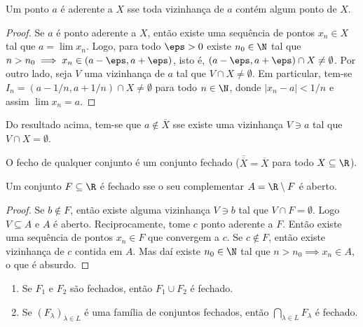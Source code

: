 \documentclass{article}
\begin{document}
\begin{prop}
    Um ponto \(a\) é aderente a \(X\) sse toda vizinhança de \(a\) contém algum ponto de \(X\).
\end{prop}

\begin{proof}
    Se \(a\) é ponto aderente a \(X\), então existe uma sequência de pontos \(x_n \in X\) tal que \(a = \lim x_n\). Logo, para todo \(\eps > 0\) existe \(n_0 \in \N\) tal que \(n > n_0 \implies x_n \in (a-\eps, a+\eps)\), isto é, \((a-\eps, a+\eps) \cap X \neq \emptyset\).
    Por outro lado, seja \(V\) uma vizinhança de \(a\) tal que \(V \cap X \neq \emptyset\). Em particular, tem-se \(I_n = (a-1/n, a+1/n) \cap X \neq \emptyset\) para todo \(n \in \N\), donde \(|x_n - a| < 1/n\) e assim \(\lim x_n = a\).
\end{proof}

\begin{rem}
    Do resultado acima, tem-se que \(a \notin \overline{X}\) sse existe uma vizinhança \(V \ni a\) tal que \(V \cap X = \emptyset\).
\end{rem}

\begin{cor}
    O fecho de qualquer conjunto é um conjunto fechado (\(\overline{\overline{X}} = \overline{X}\) para todo \(X \subseteq \R\)).
\end{cor}

\begin{prop}
    Um conjunto \(F \subseteq \R\) é fechado sse o seu complementar \(A = \R \setminus F\) é aberto.
\end{prop}

\begin{proof}
    Se \(b \notin F\), então existe alguma vizinhança \(V \ni b\) tal que \(V \cap F = \emptyset\). Logo \(V \subseteq A\) e \(A\) é aberto.
    Reciprocamente, tome \(c\) ponto aderente a \(F\). Então existe uma sequência de pontos \(x_n \in F\) que convergem a \(c\). Se \(c \notin F\), então existe vizinhança de \(c\) contida em \(A\). Mas daí existe \(n_0 \in \N\) tal que \(n > n_0 \implies x_n \in A\), o que é absurdo.
\end{proof}

\begin{thm} 
    \begin{enumerate}
        \item [(a)] Se \(F_1\) e \(F_2\) são fechados, então \(F_1 \cup F_2\) é fechado.
        \item [(b)] Se \((F_\lambda)_{\lambda \in L}\) é uma família de conjuntos fechados, então \(\bigcap_{\lambda \in L} F_\lambda\) é fechado.
    \end{enumerate}
\end{thm}
\end{document}
